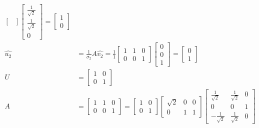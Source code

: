 \documentclass{math}
\begin{document}
\begin{align*}
\begin{bmatrix}
  \end{bmatrix}\begin{bmatrix}
    \frac{1}{\sqrt{2}} \\ \frac{1}{\sqrt{2}} \\ 0
  \end{bmatrix} = \begin{bmatrix}1 \\ 0\end{bmatrix} \\
  \hat{u_2} &= \frac{1}{\sigma_2}A\hat{v_2} = \frac{1}{1}\begin{bmatrix}
    1 & 1 & 0 \\
    0 & 0 & 1
  \end{bmatrix}\begin{bmatrix}0 \\ 0 \\ 1\end{bmatrix} = \begin{bmatrix}
    0 \\ 1
  \end{bmatrix} \\
  U &= \begin{bmatrix}
    1 & 0 \\
    0 & 1
  \end{bmatrix} \\
  A &= \begin{bmatrix}
    1 & 1 & 0 \\
    0 & 0 & 1
  \end{bmatrix} = \begin{bmatrix}
    1 & 0 \\
    0 & 1
  \end{bmatrix}\begin{bmatrix}
    \sqrt{2} & 0 & 0 \\
    0 & 1 & 1
  \end{bmatrix}\begin{bmatrix}
    \frac{1}{\sqrt{2}} & \frac{1}{\sqrt{2}} & 0 \\
    0 & 0 & 1 \\
    -\frac{1}{\sqrt{2}} & \frac{1}{\sqrt{2}} & 0
  \end{bmatrix}
\end{align*}
\end{document}
